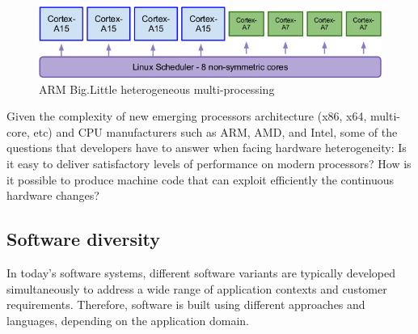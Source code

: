 \begin{figure}[h]
	\center
	\includegraphics[scale=0.7]{Background/fig/cortex.jpg}
	\caption{ARM Big.Little heterogeneous multi-processing}
	\label{fig:cortex}
\end{figure}


Given the complexity of new emerging processors architecture (x86, x64, multi-core, etc) and CPU manufacturers such as ARM, AMD, and Intel, some of the questions that developers have to answer when facing hardware heterogeneity: 
Is it easy to deliver satisfactory levels of performance on modern processors? How is it possible to produce machine code that can exploit efficiently the continuous hardware changes? 











\subsection{Software diversity}
\label{sec:Software diversity}
In today's software systems, different software variants are typically developed simultaneously to address a wide range of application contexts and customer requirements\cite{schaefer2012software}. 
Therefore, software is built using different approaches and languages, depending on the application domain.

